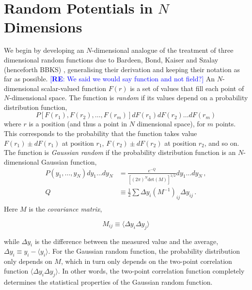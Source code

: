 \documentclass[12pt]{article}
\newcommand{\re}[1]{\textcolor{blue}{[{\bf RE}: #1]}}
\begin{document}
\section{Random Potentials in $N$ Dimensions}

We begin by developing an $N$-dimensional analogue of the treatment of three dimensional random functions due to Bardeen, Bond, Kaiser and Szalay (henceforth BBKS) \cite{BBKS}, generalising their derivation and keeping their notation as far as possible.  \re{We said we would say function and not field?} An $N$-dimensional scalar-valued function $F(r)$ is a set of values that fill each point of $N$-dimensional space. The function is \emph{random} if its values depend on a probability distribution function,
%
\begin{equation}
P[F(r_1), F(r_2), \ldots, F(r_m)]dF(r_1)dF(r_2)\ldots dF(r_m)
\end{equation}
%
\noindent where $r$ is a position (and thus a point in $N$ dimensional space), for $m$  points. This corresponds to the probability that the function takes value $F(r_1) \pm dF(r_1)$ at position $r_1$, $F(r_2) \pm dF(r_2)$ at position $r_2$, and so on. 
%
The function is \emph{Gaussian random} if the probability distribution function is an $N$-dimensional Gaussian function,
%
\begin{equation} \label{MultivariateGaussian}
\begin{split}
P(y_1,\ldots,y_N)dy_1\ldots dy_N &= \frac{e^{-Q}}{[(2\pi)^N \mathrm{det}(M)]^{1/2}} dy_1\ldots dy_N \, ,\\
Q &\equiv \frac{1}{2} \sum \Delta y_i (M^{-1})_{ij} \Delta y_{ij} \, .\\
\end{split}
\end{equation}
%
Here $M$ is the \emph{covariance matrix}, 

\begin{equation}
M_{ij} \equiv \langle \Delta y_i \Delta y_j \rangle
\end{equation}

\noindent while $\Delta y_i$ is the difference between the measured value and the average, $\Delta y_i \equiv y_i - \langle y_i \rangle$. For the Gaussian random function, the probability distribution only depends on $M$, which in turn only depends on the two-point correlation function $\langle \Delta y_i \Delta y_j \rangle$. In other words, the two-point correlation function completely determines the statistical properties of the Gaussian random function.
\end{document}
